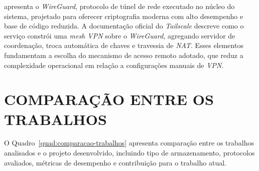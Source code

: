  apresenta o \textit{WireGuard}, protocolo de túnel de rede executado no núcleo do sistema, projetado para oferecer criptografia moderna com alto desempenho e base de código reduzida. A documentação oficial do \textit{Tailscale} \cite{tailscalehowworks} descreve como o serviço constrói uma \textit{mesh VPN} sobre o \textit{WireGuard}, agregando servidor de coordenação, troca automática de chaves e travessia de \textit{NAT}. Esses elementos fundamentam a escolha do mecanismo de acesso remoto adotado, que reduz a complexidade operacional em relação a configurações manuais de \textit{VPN}.

\section{COMPARAÇÃO ENTRE OS TRABALHOS}

O Quadro~\ref{quad:comparacao-trabalhos} apresenta comparação entre os trabalhos analisados e o projeto desenvolvido, incluindo tipo de armazenamento, protocolos avaliados, métricas de desempenho e contribuição para o trabalho atual.

